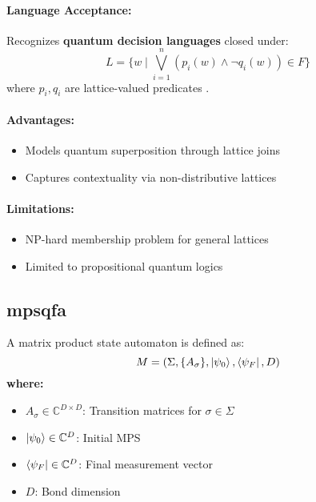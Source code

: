\paragraph{Language Acceptance:}
Recognizes \textbf{quantum decision languages} closed under:
\[
L = \{w \mid \bigvee_{i=1}^n (p_i(w) \land \neg q_i(w)) \in F\}
\]
where $p_i,q_i$ are lattice-valued predicates \cite{moore2000quantum}.

\paragraph{Advantages:}
\begin{itemize}
    \item Models quantum superposition through lattice joins
    \item Captures contextuality via non-distributive lattices
\end{itemize}

\paragraph{Limitations:}
\begin{itemize}
    \item NP-hard membership problem for general lattices
    \item Limited to propositional quantum logics
\end{itemize}

\subsection{\acrfull{mpsqfa}}
\label{subsec:mpsqfa}

\begin{definition}
A matrix product state automaton is defined as:
\[
M = (\Sigma, \{A_\sigma\}, \ket{\psi_0}, \bra{\psi_F}, D)
\]
\textbf{where:}
\begin{itemize}
    \item $A_\sigma \in \mathbb{C}^{D \times D}$: Transition matrices for $\sigma \in \Sigma$
    \item $\ket{\psi_0} \in \mathbb{C}^D$: Initial MPS
    \item $\bra{\psi_F} \in \mathbb{C}^D$: Final measurement vector
    \item $D$: Bond dimension
\end{itemize}
\end{definition}

